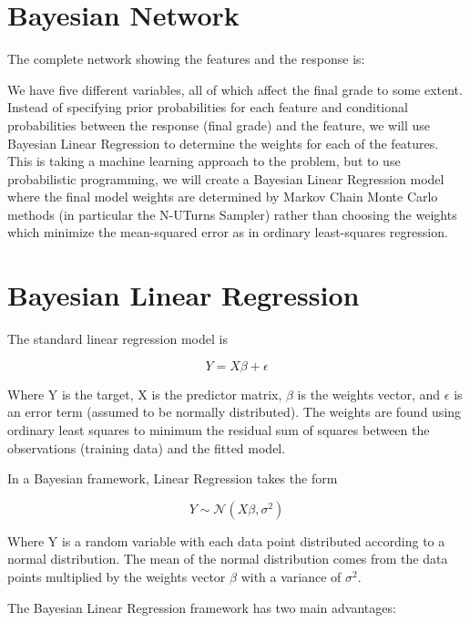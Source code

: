 \documentclass[12pt]{article}
\begin{document}
\hypertarget{bayesian-network}{%
\section{Bayesian Network}\label{bayesian-network}}

The complete network showing the features and the response is:

We have five different variables, all of which affect the final grade to
some extent. Instead of specifying prior probabilities for each feature
and conditional probabilities between the response (final grade) and the
feature, we will use Bayesian Linear Regression to determine the weights
for each of the features. This is taking a machine learning approach to
the problem, but to use probabilistic programming, we will create a
Bayesian Linear Regression model where the final model weights are
determined by Markov Chain Monte Carlo methods (in particular the
N-UTurns Sampler) rather than choosing the weights which minimize the
mean-squared error as in ordinary least-squares regression.

\hypertarget{bayesian-linear-regression}{%
\section{Bayesian Linear Regression}\label{bayesian-linear-regression}}

The standard linear regression model is

\[ Y = X\beta + \epsilon \]

Where Y is the target, X is the predictor matrix, \(\beta\) is the
weights vector, and \(\epsilon\) is an error term (assumed to be
normally distributed). The weights are found using ordinary least
squares to minimum the residual sum of squares between the observations
(training data) and the fitted model.

In a Bayesian framework, Linear Regression takes the form

\[ Y \sim \mathcal{N}(X \beta, \sigma^2) \]

Where Y is a random variable with each data point distributed according
to a normal distribution. The mean of the normal distribution comes from
the data points multiplied by the weights vector \(\beta\) with a
variance of \(\sigma^2\).

The Bayesian Linear Regression framework has two main advantages:
\end{document}
